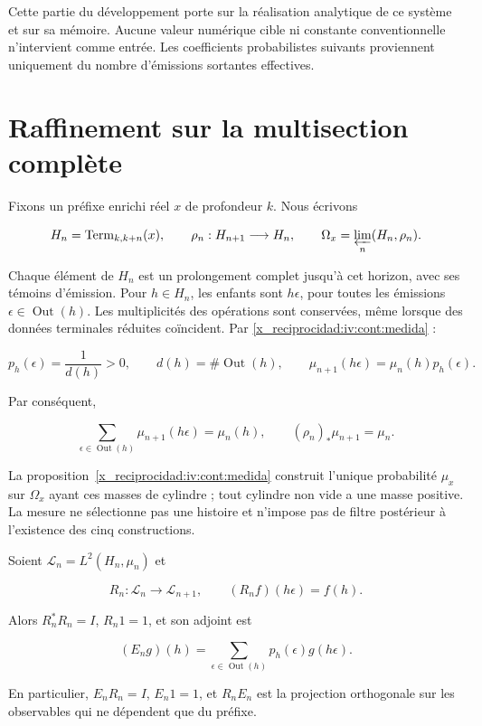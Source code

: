 Cette partie du développement porte sur la réalisation analytique de ce système et sur sa mémoire. Aucune valeur numérique cible ni constante conventionnelle n’intervient comme entrée. Les coefficients probabilistes suivants proviennent uniquement du nombre d’émissions sortantes effectives.

\section{Raffinement sur la multisection complète}

Fixons un préfixe enrichi réel \(x\) de profondeur \(k\). Nous écrivons

\[
H_n=\operatorname{Term}_{k,k+n}(x),\qquad
\rho_n:H_{n+1}\longrightarrow H_n,
\qquad \Omega_x=\varprojlim_n(H_n,\rho_n).
\]

Chaque élément de \(H_n\) est un prolongement complet jusqu’à cet horizon, avec ses témoins d’émission. Pour \(h\in H_n\), les enfants sont \(h\epsilon\), pour toutes les émissions \(\epsilon\in\operatorname{Out}(h)\). Les multiplicités des opérations sont conservées, même lorsque des données terminales réduites coïncident. Par \cref{x_reciprocidad:iv:cont:medida} :


\[
p_h(\epsilon)=\frac1{d(h)}>0,\qquad
d(h)=\#\operatorname{Out}(h),\qquad
\mu_{n+1}(h\epsilon)=\mu_n(h)p_h(\epsilon).
\]

Par conséquent,

\begin{equation}
\sum_{\epsilon\in\operatorname{Out}(h)}\mu_{n+1}(h\epsilon)=\mu_n(h),
\qquad (\rho_n)_*\mu_{n+1}=\mu_n.
\label{x_reciprocidad:nuc01:eq:1}
\end{equation}

La proposition~\ref{x_reciprocidad:iv:cont:medida} construit l’unique probabilité \(\mu_x\) sur \(\Omega_x\) ayant ces masses de cylindre ; tout cylindre non vide a une masse positive. La mesure ne sélectionne pas une histoire et n’impose pas de filtre postérieur à l’existence des cinq constructions.

\begin{proposition}
\label{x_reciprocidad:nuc01:pullback}

Soient \(\mathscr L_n=L^2(H_n,\mu_n)\) et

\[
R_n:\mathscr L_n\longrightarrow\mathscr L_{n+1},\qquad
(R_nf)(h\epsilon)=f(h).
\]

Alors \(R_n^*R_n=I\), \(R_n1=1\), et son adjoint est

\begin{equation}
(E_ng)(h)=\sum_{\epsilon\in\operatorname{Out}(h)}p_h(\epsilon)g(h\epsilon).
\label{x_reciprocidad:nuc01:eq:2}
\end{equation}

En particulier, \(E_nR_n=I\), \(E_n1=1\), et \(R_nE_n\) est la projection orthogonale sur les observables qui ne dépendent que du préfixe.
\end{proposition}

